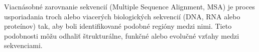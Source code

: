 Viacnásobné zarovnanie sekvencií (Multiple Sequence Alignment, MSA) je proces usporiadania troch alebo viacerých biologických sekvencií (DNA, RNA alebo proteínov) tak, aby boli identifikované podobné regióny medzi nimi. Tieto podobnosti môžu odhaliť štrukturálne, funkčné alebo evolučné vzťahy medzi sekvenciami.
